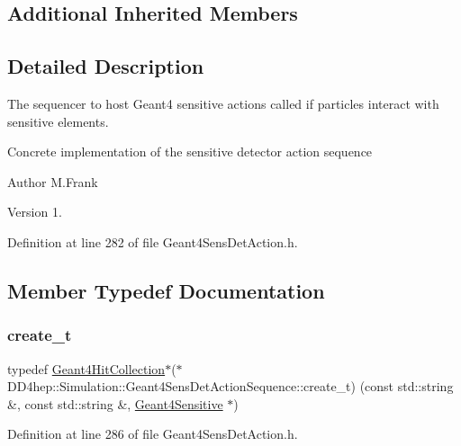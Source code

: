 \subsection*{Additional Inherited Members}


\subsection{Detailed Description}
The sequencer to host Geant4 sensitive actions called if particles interact with sensitive elements. 

Concrete implementation of the sensitive detector action sequence

\begin{DoxyAuthor}{Author}
M.\+Frank 
\end{DoxyAuthor}
\begin{DoxyVersion}{Version}
1. 
\end{DoxyVersion}


Definition at line 282 of file Geant4\+Sens\+Det\+Action.\+h.



\subsection{Member Typedef Documentation}
\hypertarget{class_d_d4hep_1_1_simulation_1_1_geant4_sens_det_action_sequence_a449bfc3938d1e870ce8af2e80c16f25f}{}\label{class_d_d4hep_1_1_simulation_1_1_geant4_sens_det_action_sequence_a449bfc3938d1e870ce8af2e80c16f25f} 
\subsubsection{\texorpdfstring{create\+\_\+t}{create\_t}}
{\footnotesize\ttfamily typedef \hyperlink{class_d_d4hep_1_1_simulation_1_1_geant4_hit_collection}{Geant4\+Hit\+Collection}$\ast$($\ast$ D\+D4hep\+::\+Simulation\+::\+Geant4\+Sens\+Det\+Action\+Sequence\+::create\+\_\+t) (const std\+::string \&, const std\+::string \&, \hyperlink{class_d_d4hep_1_1_simulation_1_1_geant4_sensitive}{Geant4\+Sensitive} $\ast$)}



Definition at line 286 of file Geant4\+Sens\+Det\+Action.\+h.

